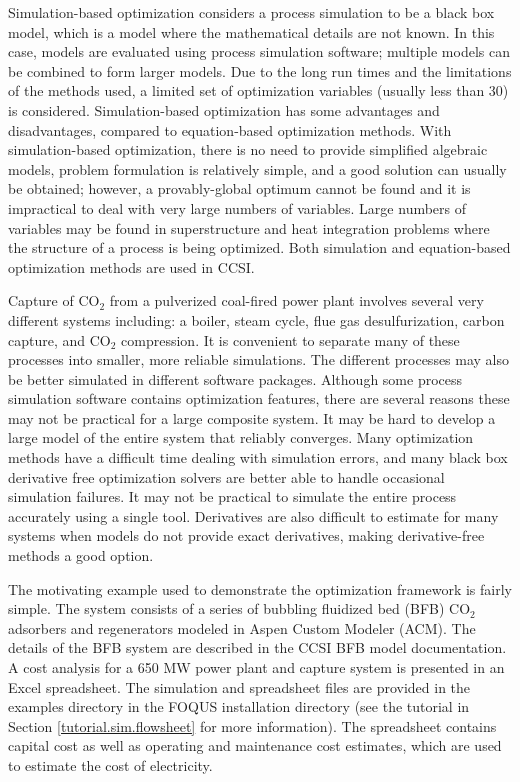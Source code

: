 Simulation-based optimization considers a process simulation to be a black box model, which is a model where the mathematical details are not known. In this case, models are evaluated using process simulation software; multiple models can be combined to form larger models. Due to the long run times and the limitations of the methods used, a limited set of optimization variables (usually less than 30) is considered. Simulation-based optimization has some advantages and disadvantages, compared to equation-based optimization methods. With simulation-based optimization, there is no need to provide simplified algebraic models, problem formulation is relatively simple, and a good solution can usually be obtained; however, a provably-global optimum cannot be found and it is impractical to deal with very large numbers of variables. Large numbers of variables may be found in superstructure and heat integration problems where the structure of a process is being optimized. Both simulation and equation-based optimization methods are used in CCSI.

Capture of CO$_2$ from a pulverized coal-fired power plant involves several very different systems including: a boiler, steam cycle, flue gas desulfurization, carbon capture, and CO$_2$ compression. It is convenient to separate many of these processes into smaller, more reliable simulations. The different processes may also be better simulated in different software packages.  Although some process simulation software contains optimization features, there are several reasons these may not be practical for a large composite system. It may be hard to develop a large model of the entire system that reliably converges. Many optimization methods have a difficult time dealing with simulation errors, and many black box derivative free optimization solvers are better able to handle occasional simulation failures. It may not be practical to simulate the entire process accurately using a single tool. Derivatives are also difficult to estimate for many systems when models do not provide exact derivatives, making derivative-free methods a good option.

The motivating example used to demonstrate the optimization framework is fairly simple. The system consists of a series of bubbling fluidized bed (BFB) CO$_2$ adsorbers and regenerators modeled in Aspen Custom Modeler (ACM). The details of the BFB system are described in the CCSI BFB model documentation. A cost analysis for a 650 MW power plant and capture system is presented in an Excel spreadsheet. The simulation and spreadsheet files are provided in the examples directory in the FOQUS installation directory (see the tutorial in Section \ref{tutorial.sim.flowsheet} for more information). The spreadsheet contains capital cost as well as operating and maintenance cost estimates, which are used to estimate the cost of electricity.  

